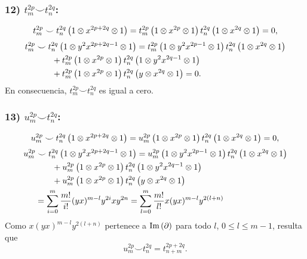 \documentclass[fleqn,../tesis.tex]{subfiles}
\begin{document}
\subsubsection{12) $t_m^{2p} \smile t_n^{2q}$:}
\begin{align*}
	t_m^{2p}\smile t_n^{2q}\left(1\otimes x^{2p + 2q} \otimes 1\right)
		= t_m^{2p}\left(1\otimes x^{2p}\otimes 1\right)t_n^{2q}\left(1\otimes x^{2q}\otimes 1\right) = 0,
\end{align*}
\begin{align*}
	t_m^{2p} & \smile t_n^{2q}\left(1\otimes y^2x^{2p + 2q - 1} \otimes 1\right)
		= t_m^{2p}\left(1\otimes y^2x^{2p - 1}\otimes 1\right)t_n^{2q}\left(1\otimes x^{2q}\otimes 1\right)\\
	&\qquad + t_m^{2p}\left(1 \otimes x^{2p} \otimes 1\right)t_n^{2q}\left(1\otimes y^2x^{2q - 1}\otimes 1\right)\\
	&\qquad + t_m^{2p}\left(1 \otimes x^{2p} \otimes 1\right)t_n^{2q}\left(y\otimes x^{2q}\otimes 1\right) = 0.
\end{align*}
En consecuencia, $t_m^{2p}\smile t_n^{2q}$ es igual a cero.
\subsubsection{13) $u_m^{2p} \smile t_n^{2q}$:}
\begin{align*}
	u_m^{2p}\smile t_n^{2q}\left(1\otimes x^{2p + 2q} \otimes 1\right)
		= u_m^{2p}\left(1\otimes x^{2p}\otimes 1\right)t_n^{2q}\left(1\otimes x^{2q}\otimes 1\right) = 0,
\end{align*}
\begin{align*}
	u_m^{2p} & \smile t_n^{2q}\left(1\otimes y^2x^{2p + 2q - 1} \otimes 1\right)
		= u_m^{2p}\left(1\otimes y^2x^{2p - 1}\otimes 1\right)t_n^{2q}\left(1\otimes x^{2q}\otimes 1\right)\\
	&\qquad + u_m^{2p}\left(1 \otimes x^{2p} \otimes 1\right)t_n^{2q}\left(1\otimes y^2x^{2q - 1}\otimes 1\right)\\
	&\qquad + u_m^{2p}\left(1 \otimes x^{2p} \otimes 1\right)t_n^{2q}\left(y\otimes x^{2q}\otimes 1\right)\\
	&= \sum_{i = 0}^{m}\frac{m!}{i!}(yx)^{m - l}y^{2i}xy^{2n}
		= \sum_{l = 0}^{m}\frac{m!}{l!}x(yx)^{m - l}y^{2(l + n)}
\end{align*}
Como $x(yx)^{m - l}y^{2(l + n)}$ pertenece a $\operatorname{Im}\left(\partial\right)$ para todo $l$, $0 \leq l \leq m - 1$,
resulta que \[u_m^{2p}  \smile t_n^{2q} = t_{n + m}^{2p + 2q}.\]
\end{document}
